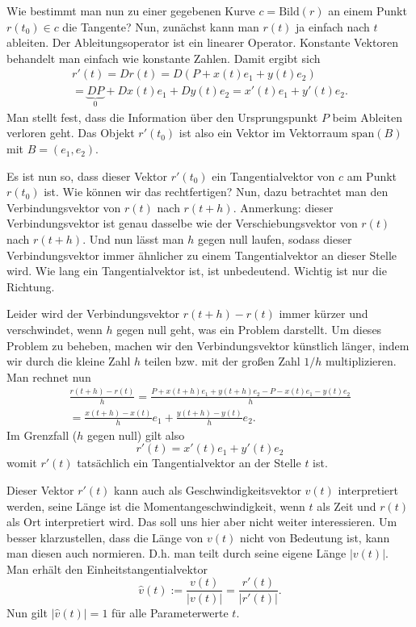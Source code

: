 \documentclass[a4paper,12pt,fleqn]{article}
\begin{document}
Wie bestimmt man nun zu einer gegebenen Kurve $c=\mathrm{Bild}(r)$
an einem Punkt $r(t_0)\in c$ die Tangente? Nun, zunächst kann man
$r(t)$ ja einfach nach $t$ ableiten. Der Ableitungsoperator
ist ein linearer Operator. Konstante Vektoren behandelt man einfach
wie konstante Zahlen. Damit ergibt sich
\begin{gather*}
r'(t) = Dr(t) = D(P+x(t)e_1+y(t)e_2)\\
= \underbrace{DP}_{0}+Dx(t)e_1+Dy(t)e_2 = x'(t)e_1+y'(t)e_2.
\end{gather*}
Man stellt fest, dass die Information über den Ursprungspunkt $P$
beim Ableiten verloren geht. Das Objekt $r'(t_0)$ ist also ein
Vektor im Vektorraum $\mathrm{span}(B)$ mit $B=(e_1,e_2)$.

Es ist nun so, dass dieser Vektor $r'(t_0)$ ein Tangentialvektor
von $c$ am Punkt $r(t_0)$ ist. Wie können wir das rechtfertigen?
Nun, dazu betrachtet man den Verbindungsvektor von $r(t)$ nach
$r(t+h)$. Anmerkung: dieser Verbindungsvektor ist genau dasselbe
wie der Verschiebungsvektor von $r(t)$ nach $r(t+h)$.
Und nun lässt man $h$ gegen null laufen, sodass dieser
Verbindungsvektor immer ähnlicher zu einem Tangentialvektor an dieser
Stelle wird. Wie lang ein Tangentialvektor ist, ist unbedeutend.
Wichtig ist nur die Richtung.

Leider wird der Verbindungsvektor $r(t+h)-r(t)$ immer kürzer
und verschwindet, wenn $h$ gegen null geht, was ein Problem darstellt.
Um dieses Problem zu beheben, machen wir den Verbindungsvektor
künstlich länger, indem wir durch die kleine Zahl $h$ teilen bzw. mit
der großen Zahl $1/h$ multiplizieren. Man rechnet nun
\begin{gather*}
\frac{r(t+h)-r(t)}{h}
= \frac{P+x(t+h)e_1+y(t+h)e_2-P-x(t)e_1-y(t)e_2}{h}\\
= \frac{x(t+h)-x(t)}{h}e_1 + \frac{y(t+h)-y(t)}{h}e_2.
\end{gather*}
Im Grenzfall ($h$ gegen null) gilt also
\[r'(t) = x'(t)e_1+y'(t)e_2\]
womit $r'(t)$ tatsächlich ein Tangentialvektor an der Stelle $t$
ist.

Dieser Vektor $r'(t)$ kann auch als Geschwindigkeitsvektor $v(t)$
interpretiert werden, seine Länge ist die Momentangeschwindigkeit,
wenn $t$ als Zeit und $r(t)$ als Ort interpretiert wird.
Das soll uns hier aber nicht weiter interessieren.
Um besser klarzustellen, dass die Länge von $v(t)$
nicht von Bedeutung ist, kann man diesen auch normieren.
D.h. man teilt durch seine eigene Länge $|v(t)|$.
Man erhält den Einheitstangentialvektor
\begin{equation}
\hat v(t) := \frac{v(t)}{|v(t)|} = \frac{r'(t)}{|r'(t)|}.
\end{equation}
Nun gilt $|\hat v(t)|=1$ für alle Parameterwerte $t$.
\end{document}
